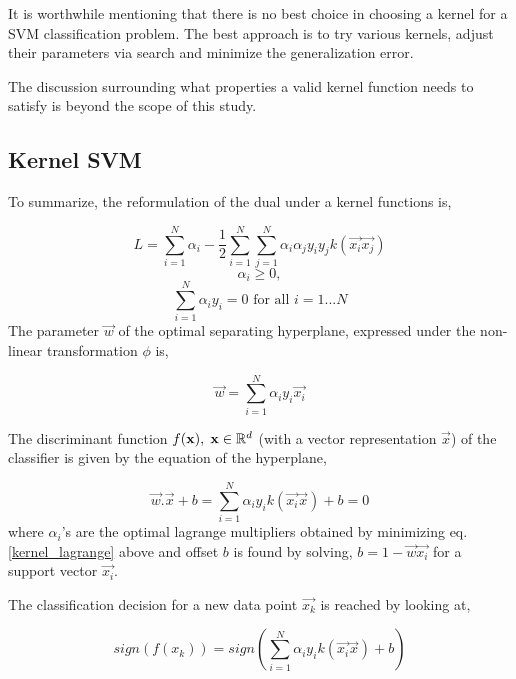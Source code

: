 \documentclass[final,3p,times,twocolumn]{elsarticle}
\begin{document}
It is worthwhile mentioning that there is no best choice in choosing a kernel for a SVM classification problem. The best approach is to try various kernels, adjust their parameters via search and minimize the generalization error.
  
The discussion surrounding what properties a valid kernel function needs to satisfy is beyond the scope of this study.  

\subsection{Kernel SVM}

To summarize, the reformulation of the dual under a kernel functions is,

\begin{equation}
L = \sum_{i=1}^N\alpha_{i} - \frac{1}{2}\sum_{i=1}^N\sum_{j=1}^N\alpha_{i}\alpha_{j}y_{i}y_{j}k(\vec{x_{i}}\vec{x_{j}})
\label{kernel_lagrange}
\end{equation}
\begin{equation*}
\alpha_{i} \geqslant 0,  
\end{equation*}
\begin{equation*}
\sum_{i=1}^N\alpha_{i}y_{i} = 0 \textrm{ for all }  i = 1...N
\end{equation*}
The parameter $\vec{w}$ of the optimal separating hyperplane, expressed under the non-linear transformation $\phi$ is, 

\begin{equation*}
\vec{w} = \sum_{i=1}^N\alpha_{i}y_{i}\vec{x_{i}}
\end{equation*}

The discriminant function $f(\textbf{x}), \hspace{1mm} \textbf{x} \in \mathbb{R}^d$ (with a vector representation $\vec{x}$) of the classifier is given by the equation of the hyperplane, 

\begin{equation*}
\vec{w}.\vec{x} + b = \sum_{i=1}^N \alpha_{i}y_{i}k(\vec{x_{i}}\vec{x}) + b = 0
\end{equation*}
where $\alpha_{i}$'s are the optimal lagrange multipliers obtained by minimizing eq. \ref{kernel_lagrange} above and offset $b$ is found by solving,
$b = 1 - \vec{w}\vec{x_{i}}$ for a support vector $\vec{x_{i}}$.

The classification decision for a new data point $\vec{x_{k}}$ is reached by looking at,

\begin{equation}
sign(f(x_{k})) = sign\left(\sum_{i=1}^N \alpha_{i}y_{i}k(\vec{x_{i}}\vec{x}) + b  \right)
\label{kernel_classify}
\end{equation}
\end{document}
